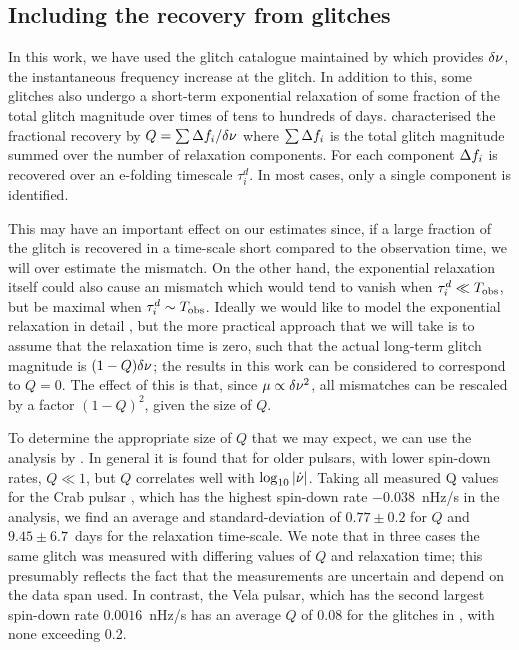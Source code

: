 \documentclass[../full_thesis/full_thesis.tex]{subfiles}
\begin{document}
\subsection{Including the recovery from glitches}
\label{sec: recovery}
In this work, we have used the glitch catalogue maintained by \citet{Espinoza2011}
which provides $\delta\nu$, the instantaneous frequency increase at the
glitch. In addition to this, some glitches also undergo a short-term
exponential relaxation of some fraction of the total glitch magnitude over
times of tens to hundreds of days. \citet{Lyne2000} characterised the
fractional recovery by $Q = \sum \Delta f_i/\delta\nu$ where $\sum
\Delta f_i$ is the total glitch magnitude summed over the number of relaxation
components. For each component $\Delta f_i$ is recovered over an
e-folding timescale $\tau^d_i$. In most cases, only a single component is
identified.

This may have an important effect on our estimates since, if a large fraction
of the glitch is recovered in a time-scale short compared to the observation
time, we will over estimate the mismatch. On the other hand, the exponential
relaxation itself could also cause an mismatch which would tend to vanish when
$\tau^d_i \ll T_{\mathrm{obs}}$, but be maximal when $\tau^d_i \sim T_{\mathrm{obs}}$.  Ideally we would
like to model the exponential relaxation in detail , but the more practical
approach that we will take is to assume that the relaxation time is zero, such
that the actual long-term glitch magnitude is $(1-Q)\delta\nu$; the results in
this work can be considered to correspond to $Q=0$. The effect of this is that,
since $\mu \propto \delta\nu^2$, all mismatches can be rescaled by a factor
$(1-Q)^{2}$, given the size of $Q$.

To determine the appropriate size of $Q$ that we may expect, we can use the
analysis by \citet{Lyne2000}. In general it is found that for older pulsars,
with lower spin-down rates, $Q\ll1$, but $Q$ correlates well with
$\log_{10}|\dot{\nu}|$. Taking all measured Q values for the Crab pulsar
\citep{Lyne2000, Wang2001, Wang2012}, which has the highest spin-down rate
$-0.038$~nHz/s in the analysis, we find an average and standard-deviation of
$0.77\pm0.2$ for $Q$ and $9.45\pm6.7$~days for the relaxation time-scale. We
note that in three cases the same glitch was measured with differing values of
$Q$ and relaxation time; this presumably reflects the fact that the
measurements are uncertain and depend on the data span used. In contrast, the
Vela pulsar, which has the second largest spin-down rate $0.0016$~nHz/s has an
average $Q$ of 0.08 for the glitches in \citet{Lyne2000}, with none exceeding
0.2.
\end{document}
